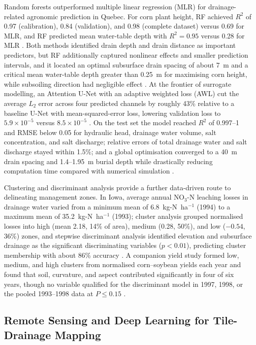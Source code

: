 \documentclass[11pt]{article}
\begin{document}
Random forests outperformed multiple linear regression (MLR) for
drainage-related agronomic prediction in Quebec. For corn plant height, RF
achieved $R^2$ of 0.97 (calibration), 0.84 (validation), and 0.98 (complete
dataset) versus 0.69 for MLR, and RF predicted mean water-table depth with
$R^2=0.95$ versus 0.28 for MLR \parencite{Djiemon2019}. Both methods identified
drain depth and drain distance as important predictors, but RF additionally
captured nonlinear effects and smaller prediction intervals, and it located an
optimal subsurface drain spacing of about 7~m and a critical mean water-table
depth greater than 0.25~m for maximising corn height, while subsoiling direction
had negligible effect \parencite{Djiemon2019}. At the frontier of surrogate
modelling, an Attention U-Net with an adaptive weighted loss (AWL) cut the
average $L_2$ error across four predicted channels by roughly 43\% relative to a
baseline U-Net with mean-squared-error loss, lowering validation loss to
$5.9\times10^{-5}$ versus $8.5\times10^{-5}$ \parencite{Lei2026}. On the test set
the model reached $R^2$ of 0.997--1 and RMSE below 0.05 for hydraulic head,
drainage water volume, salt concentration, and salt discharge; relative errors
of total drainage water and salt discharge stayed within 1.5\%; and a global
optimisation converged to a 40~m drain spacing and 1.4--1.95~m burial depth
while drastically reducing computation time compared with numerical simulation
\parencite{Lei2026}.

Clustering and discriminant analysis provide a further data-driven route to
delineating management zones. In Iowa, average annual NO$_3$-N leaching losses in
drainage water varied from a minimum mean of 6.8~kg-N~ha$^{-1}$ (1994) to a
maximum mean of 35.2~kg-N~ha$^{-1}$ (1993); cluster analysis grouped normalised
losses into high (mean 2.18, 14\% of area), medium (0.28, 50\%), and low
($-0.54$, 36\%) zones, and stepwise discriminant analysis identified elevation
and subsurface drainage as the significant discriminating variables
($p<0.01$), predicting cluster membership with about 86\% accuracy
\parencite{Bakhsh2005b}. A companion yield study formed low, medium, and high
clusters from normalised corn--soybean yields each year and found that soil,
curvature, and aspect contributed significantly in four of six years, though no
variable qualified for the discriminant model in 1997, 1998, or the pooled
1993--1998 data at $P\le0.15$ \parencite{Bakhsh2007b}.

\subsection{Remote Sensing and Deep Learning for Tile-Drainage Mapping}
\end{document}
